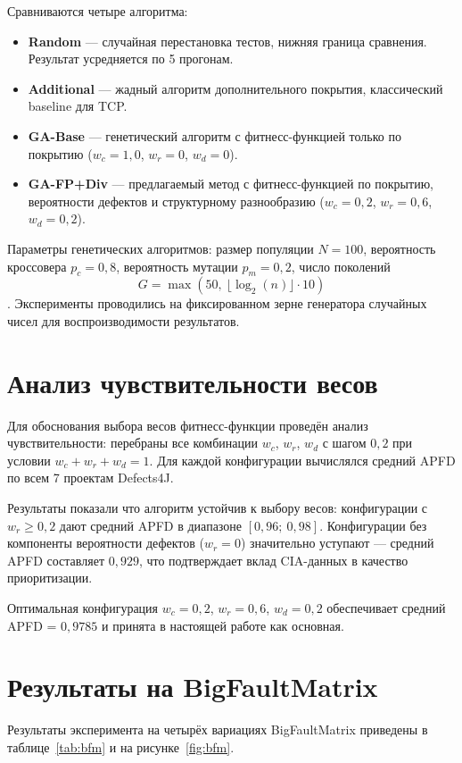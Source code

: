 \newpage
Сравниваются четыре алгоритма:
\begin{itemize}
    \item \textbf{Random} --- случайная перестановка тестов, 
    нижняя граница сравнения. Результат усредняется по 5 прогонам.
    \item \textbf{Additional} --- жадный алгоритм дополнительного 
    покрытия, классический baseline для TCP.
    \item \textbf{GA-Base} --- генетический алгоритм с фитнесс-функцией 
    только по покрытию ($w_c = 1{,}0$, $w_r = 0$, $w_d = 0$).
    \item \textbf{GA-FP+Div} --- предлагаемый метод с 
    фитнесс-функцией по покрытию, вероятности дефектов и 
    структурному разнообразию ($w_c = 0{,}2$, $w_r = 0{,}6$, 
    $w_d = 0{,}2$).
\end{itemize}


Параметры генетических алгоритмов: размер популяции $N = 100$, вероятность кроссовера $p_c = 0{,}8$, 
вероятность мутации $p_m = 0{,}2$, число поколений $$G = \max(50,\ 
\lfloor\log_2(n)\rfloor \cdot 10)$$. 
Эксперименты проводились на фиксированном зерне генератора случайных чисел для воспроизводимости результатов.

\section{Анализ чувствительности весов} \label{ch6:sec2}

Для обоснования выбора весов фитнесс-функции проведён анализ 
чувствительности: перебраны все комбинации $w_c$, $w_r$, $w_d$ 
с шагом $0{,}2$ при условии $w_c + w_r + w_d = 1$. Для каждой 
конфигурации вычислялся средний APFD по всем 7 проектам Defects4J.

Результаты показали что алгоритм устойчив к выбору весов: 
конфигурации с $w_r \geq 0{,}2$ дают средний APFD в диапазоне 
$[0{,}96;\ 0{,}98]$. Конфигурации без компоненты вероятности 
дефектов ($w_r = 0$) значительно уступают --- средний APFD 
составляет $0{,}929$, что подтверждает вклад CIA-данных в 
качество приоритизации.

Оптимальная конфигурация $w_c = 0{,}2$, $w_r = 0{,}6$, 
$w_d = 0{,}2$ обеспечивает средний APFD = $0{,}9785$ и принята 
в настоящей работе как основная.

\section{Результаты на BigFaultMatrix} \label{ch6:sec3}
Результаты эксперимента на четырёх вариациях BigFaultMatrix 
приведены в таблице~\ref{tab:bfm} и на рисунке~\ref{fig:bfm}.

